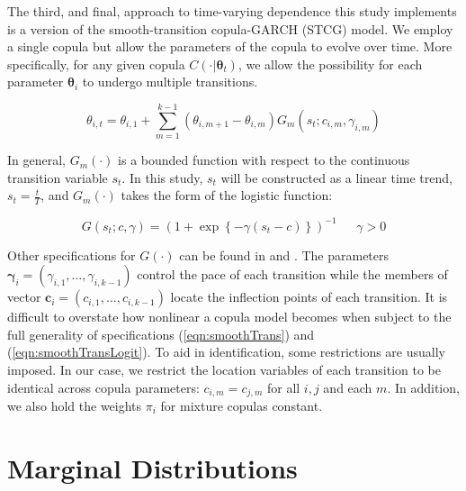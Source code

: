 \documentclass[12pt]{article}
\begin{document}
The third, and final, approach to time-varying dependence this study implements is a version of the smooth-transition copula-GARCH (STCG) model. We employ a single copula but allow the parameters of the copula to evolve over time. More specifically, for any given copula $C\left(\cdot | \mathbf{\theta}_{t}\right)$, we allow the possibility for each parameter $\boldsymbol{\theta}_{i}$ to undergo multiple transitions.

\begin{equation} \label{eqn:smoothTrans}
	\theta_{i,t} = \theta_{i,1} + \sum_{m=1}^{k-1}\left(\theta_{i,m+1} - \theta_{i,m}\right) G_{m}\left(s_{t}; c_{i,m},\gamma_{i,m}\right)
\end{equation}

In general, $G_{m}\left(\cdot\right)$ is a bounded function with respect to the continuous transition variable $s_{t}$. In this study, $s_{t}$ will be constructed as a linear time trend, $s_{t}=\frac{t}{T}$, and $G_{m}\left(\cdot\right)$ takes the form of the logistic function:

\begin{equation} \label{eqn:smoothTransLogit}
	G\left(s_{t}; c, \gamma\right) = \left(1+\exp\left\{ -\gamma \left(s_{t}-c\right) \right\}\right)^{-1}~~~~~~~\gamma > 0
\end{equation}

Other specifications for $G\left( \cdot \right) $ can be found in \cite{Dijk_and_Frances_1999} and \cite{Ocal_and_Osborn_2000}. The parameters $\boldsymbol{\gamma}_{i} = \left(\gamma_{i,1},...,\gamma_{i,k-1}\right)$ control the pace of each transition while the members of vector $\mathbf{c}_{i} = \left(c_{i,1},...,c_{i,k-1}\right)$ locate the inflection points of each transition. It is difficult to overstate how nonlinear a copula model becomes when subject to the full generality of specifications (\ref{eqn:smoothTrans}) and (\ref{eqn:smoothTransLogit}). To aid in identification, some restrictions are usually imposed. In our case, we restrict the location variables of each transition to be identical across copula parameters: $c_{i,m}=c_{j,m}$ for all $i,j$ and each $m$. In addition, we also hold the weights $\pi_{i}$ for mixture copulas constant.

\section{Marginal Distributions} \label{sec:marginal_distributions}
\end{document}
